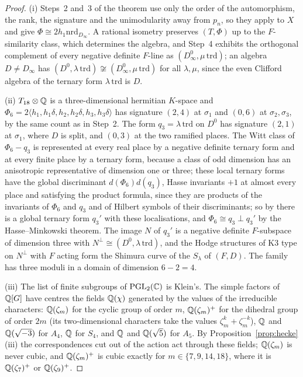 \begin{proof}
(i) Steps~2 and~3 of the theorem use only the order of the automorphism, the rank, the signature and the unimodularity away from $p_{n}$, so they apply to $X$ and give $\Phi\cong2h_{1}\mathrm{nrd}_{D_{\infty}}$. A rational isometry preserves $(T,\Phi)$ up to the $F$-similarity class, which determines the algebra, and Step~4 exhibits the orthogonal complement of every negative definite $F$-line as $(D_{\infty}^{0},\mu\,\mathrm{trd})$; an algebra $D\ne D_{\infty}$ has $(D^{0},\lambda\,\mathrm{trd})\not\cong(D_{\infty}^{0},\mu\,\mathrm{trd})$ for all $\lambda,\mu$, since the even Clifford algebra of the ternary form $\lambda\,\mathrm{trd}$ is $D$.

(ii) $T_{18}\otimes\mathbb{Q}$ is a three-dimensional hermitian $K$-space and $\Phi_{6}=2\langle h_{1},h_{1}\delta,h_{2},h_{2}\delta,h_{3},h_{3}\delta\rangle$ has signature $(2,4)$ at $\sigma_{1}$ and $(0,6)$ at $\sigma_{2},\sigma_{3}$, by the same count as in Step~2. The form $q_{3}=\lambda\,\mathrm{trd}$ on $D^{0}$ has signature $(2,1)$ at $\sigma_{1}$, where $D$ is split, and $(0,3)$ at the two ramified places. The Witt class of $\Phi_{6}-q_{3}$ is represented at every real place by a negative definite ternary form and at every finite place by a ternary form, because a class of odd dimension has an anisotropic representative of dimension one or three; these local ternary forms have the global discriminant $d(\Phi_{6})d(q_{3})$, Hasse invariants $+1$ at almost every place and satisfying the product formula, since they are products of the invariants of $\Phi_{6}$ and $q_{3}$ and of Hilbert symbols of their discriminants; so by \cite[Thm.~72:1]{OMe00} there is a global ternary form $q_{3}'$ with these localisations, and $\Phi_{6}\cong q_{3}\perp q_{3}'$ by the Hasse--Minkowski theorem. The image $N$ of $q_{3}'$ is a negative definite $F$-subspace of dimension three with $N^{\perp}\cong(D^{0},\lambda\,\mathrm{trd})$, and the Hodge structures of K3 type on $N^{\perp}$ with $F$ acting form the Shimura curve of the $S_{\lambda}$ of $(F,D)$. The family has three moduli \cite[\S5.4]{vGS25} in a domain of dimension $6-2=4$.

(iii) The list of finite subgroups of $\mathrm{PGL}_{2}(\mathbb{C})$ is Klein's. The simple factors of $\mathbb{Q}[G]$ have centres the fields $\mathbb{Q}(\chi)$ generated by the values of the irreducible characters: $\mathbb{Q}(\zeta_{m})$ for the cyclic group of order $m$, $\mathbb{Q}(\zeta_{m})^{+}$ for the dihedral group of order $2m$ (its two-dimensional characters take the values $\zeta_{m}^{k}+\zeta_{m}^{-k}$), $\mathbb{Q}$ and $\mathbb{Q}(\sqrt{-3})$ for $A_{4}$, $\mathbb{Q}$ for $S_{4}$, and $\mathbb{Q}$ and $\mathbb{Q}(\sqrt5)$ for $A_{5}$. By Proposition~\ref{prop:hecke}(iii) the correspondences cut out of the action act through these fields; $\mathbb{Q}(\zeta_{m})$ is never cubic, and $\mathbb{Q}(\zeta_{m})^{+}$ is cubic exactly for $m\in\{7,9,14,18\}$, where it is $\mathbb{Q}(\zeta_{7})^{+}$ or $\mathbb{Q}(\zeta_{9})^{+}$.
\end{proof}

